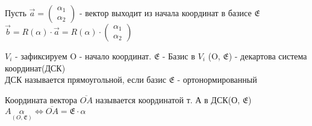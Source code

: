 \begin{exercise}
	Пусть $\vec{a} = \begin{pmatrix}
		\alpha_1 \\
		\alpha_2
	\end{pmatrix}$ - вектор выходит из начала координат в базисе \(\mathfrak{E}\) $\vec{b} = R(\alpha)\cdot\vec{a} = R(\alpha) \cdot\begin{pmatrix}
		\alpha_1 \\
		\alpha_2
	\end{pmatrix}$
\end{exercise}
\(V_i\) - зафиксируем O - начало координат. \(\mathfrak{E}\) - Базис в $V_i$ (O, $\mathfrak{E}$) - декартова система координат(ДСК) \\
ДСК называется прямоугольной, если базис \(\mathfrak{E}\) - ортонормированный
\begin{definition}
	Координата вектора $\overline{OA}$ называется координатой т. А в ДСК(О, $\mathfrak{E}$) \\
	\(A\underset{(O, \mathfrak{E})}{\alpha}\Longleftrightarrow \overline{OA} = \mathfrak{E}\cdot\alpha\)
\end{definition}

